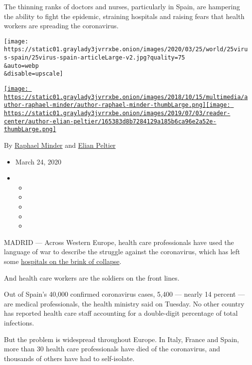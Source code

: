 The thinning ranks of doctors and nurses, particularly in Spain, are
hampering the ability to fight the epidemic, straining hospitals and
raising fears that health workers are spreading the coronavirus.

\texttt{[image: https://static01.graylady3jvrrxbe.onion/images/2020/03/25/world/25virus-spain/25virus-spain-articleLarge-v2.jpg?quality=75\\\&auto=webp\\\&disable=upscale]}

\href{https://www.nytimes3xbfgragh.onion/by/raphael-minder}{\texttt{[image: https://static01.graylady3jvrrxbe.onion/images/2018/10/15/multimedia/author-raphael-minder/author-raphael-minder-thumbLarge.png]}}\href{https://www.nytimes3xbfgragh.onion/by/elian-peltier}{\texttt{[image: https://static01.graylady3jvrrxbe.onion/images/2019/07/03/reader-center/author-elian-peltier/165383d8b7284129a185b6ca96e2a52e-thumbLarge.png]}}

By \href{https://www.nytimes3xbfgragh.onion/by/raphael-minder}{Raphael
Minder} and
\href{https://www.nytimes3xbfgragh.onion/by/elian-peltier}{Elian
Peltier}

\begin{itemize}
\item
  March 24, 2020
\item
  \begin{itemize}
  \item
  \item
  \item
  \item
  \item
  \end{itemize}
\end{itemize}

MADRID --- Across Western Europe, health care professionals have used
the language of war to describe the struggle against the coronavirus,
which has left some
\href{https://www.nytimes3xbfgragh.onion/2020/03/12/world/europe/12italy-coronavirus-health-care.html}{hospitals
on the brink of collapse}.

And health care workers are the soldiers on the front lines.

Out of Spain's 40,000 confirmed coronavirus cases, 5,400 --- nearly 14
percent --- are medical professionals, the health ministry said on
Tuesday. No other country has reported health care staff accounting for
a double-digit percentage of total infections.

But the problem is widespread throughout Europe. In Italy, France and
Spain, more than 30 health care professionals have died of the
coronavirus, and thousands of others have had to self-isolate.

